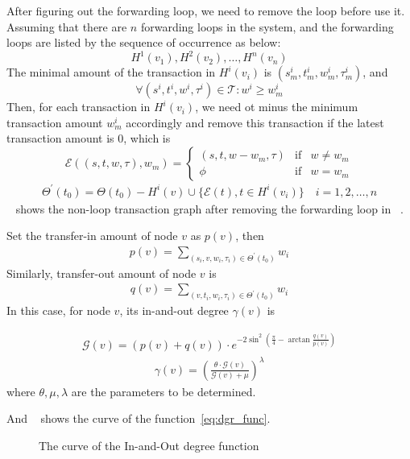 


After figuring out the forwarding loop, we need to remove the loop before use it. Assuming that there are $n$ forwarding loops in the system, and the forwarding loops are listed by the sequence of occurrence as below:
\[
H^1(v_1), H^2(v_2), \dots, H^n(v_n)\]
\noindent The minimal amount of the transaction in $H^i(v_i)$ is $(s^i_m, t^i_m, w^i_m, \tau^i_m)$, and
\[
\forall (s^i, t^i, w^i, \tau^i) \in \mathcal{T} : w^i \ge w^i_m
\]
\noindent Then, for each transaction in $H^i(v_i)$, we need ot minus the minimum transaction amount $w^i_m$ accordingly and remove this transaction if the latest transaction amount is 0, which is
\[
\mathcal{E}((s, t, w, \tau), w_m) = \left\{ \begin{array}{rcl}
(s, t, w-w_m, \tau) & \mbox{if} & w \ne w_m \\
\phi & \mbox{if} & w = w_m
\end{array}\right.
\]
\begin{align}
\Theta^{\prime}(t_0)=\Theta(t_0)-H^i(v) \cup \{\mathcal{E}(t), t\in H^i(v_i)\} \quad i = 1, 2,\dots, n
\end{align}
\noindent ~ shows the non-loop transaction graph after removing the forwarding loop in ~.


Set the transfer-in amount of node $v$ as $p(v)$, then
\begin{align}
\label{eq:dgr_func}
p(v) = \sum_{(s_i, v, w_i, \tau_i) \in \Theta^{\prime}(t_0)}{w_i}
\end{align}
\noindent Similarly, transfer-out amount of node $v$ is
\begin{align}
q(v) = \sum_{(v, t_i, w_i, \tau_i) \in \Theta^{\prime}(t_0)}{w_i}
\end{align}
\noindent In this case,
for node $v$, its in-and-out degree $\gamma(v)$ is

\begin{align}
\mathcal{G}(v) = (p(v) + q(v)) \cdot e^{-2\sin^2{(\frac{\pi}{4} - \arctan\frac{q(v)}{p(v)})}}
\end{align}
\begin{align}
\gamma(v) = (\frac{\theta\cdot \mathcal{G}(v)}{\mathcal{G}(v) + \mu})^{\lambda}
\end{align}
\noindent where $\theta, \mu, \lambda$ are the parameters to be determined.


And ~ shows the curve of the function~\ref{eq:dgr_func}.
\begin{figure}
  \centering
  
\caption{The curve of the In-and-Out degree function \label{fig-surf}}
\end{figure}

